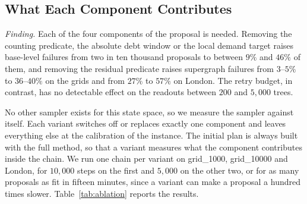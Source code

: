 \documentclass[11pt]{article}
\theoremstyle{definition}
\begin{document}
\begin{table}[!htbp]
\centering
\small

\caption{Rejected proposals by cause, as shares of all proposals: the scaling sweep on the grids (one chain of $10{,}000$ steps each) and the four London chains pooled. The four causes are defined in Section~\ref{sec:feasibility}.}
\label{tab:rejections}
\end{table}

\subsection{What Each Component Contributes}\label{sec:exp-ablation}

\emph{Finding.} Each of the four components of the proposal is needed. Removing the counting predicate, the absolute debt window or the local demand target raises base-level failures from two in ten thousand proposals to between $9\%$ and $46\%$ of them, and removing the residual predicate raises supergraph failures from $3$--$5\%$ to $36$--$40\%$ on the grids and from $27\%$ to $57\%$ on London. The retry budget, in contrast, has no detectable effect on the readouts between $200$ and $5{,}000$ trees.

No other sampler exists for this state space, so we measure the sampler against itself. Each variant switches off or replaces exactly one component and leaves everything else at the calibration of the instance. The initial plan is always built with the full method, so that a variant measures what the component contributes inside the chain. We run one chain per variant on grid\_1000, grid\_10000 and London, for $10{,}000$ steps on the first and $5{,}000$ on the other two, or for as many proposals as fit in fifteen minutes, since a variant can make a proposal a hundred times slower. Table~\ref{tab:ablation} reports the results.

\begin{table}[!htbp]
\centering
\small\setlength{\tabcolsep}{4pt}
\resizebox{\linewidth}{!}{}
\caption{Component ablations: one chain per variant and instance. ``Accepted'' is the share of proposals that close. ``Base'' and ``supergr.''\ are the shares of proposals rejected because the level-1 recursion or the supergraph recursion exhausted its retry budget; the remaining rejections are re-cuts that would leave a superdistrict with fewer than $\kappa^2_{\min}$ districts. Variants that reached the fifteen-minute cap made fewer proposals than the full method: without the counting predicate, with the scaled window and with the global target, $2{,}194$, $1{,}262$ and $490$ on grid\_1000 and $995$, $755$ and $182$ on grid\_10000, and $2{,}405$ with the global target on London.}
\label{tab:ablation}
\end{table}
\end{document}
